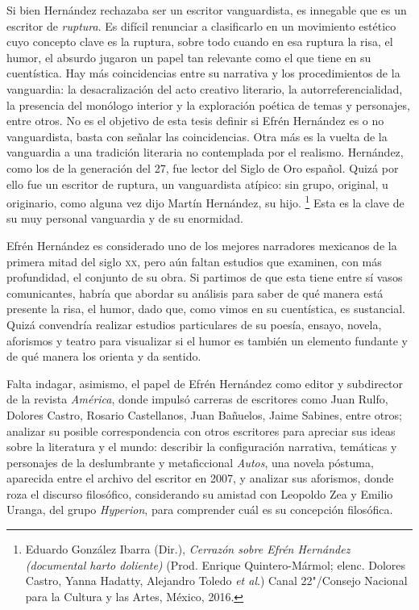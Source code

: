 \documentclass[14pt,twoside,final]{extbook} %
\let\oldfootnote\footnote
\renewcommand\footnote[1]{%
\oldfootnote{\hspace{1mm}#1}}
\begin{document}
Si bien Hernández rechazaba ser un escritor vanguardista, es innegable que es un escritor de \emph{ruptura}. Es difícil renunciar a clasificarlo en un movimiento estético cuyo concepto clave es la ruptura, sobre todo cuando en esa ruptura la risa, el humor, el absurdo jugaron un papel tan relevante como el que tiene en su cuentística. Hay más coincidencias entre su narrativa y los procedimientos de la vanguardia: la desacralización del acto creativo literario, la autorreferencialidad, la presencia del monólogo interior y la exploración poética de temas y personajes, entre otros. No es el objetivo de esta tesis definir si Efrén Hernández es o no vanguardista, basta con señalar las coincidencias. Otra más es la vuelta de la vanguardia a una tradición literaria no contemplada por el realismo. Hernández, como los de la generación del 27, fue lector del Siglo de Oro español. Quizá por ello fue un escritor de ruptura, un vanguardista atípico: sin grupo, original, u originario, como alguna vez dijo Martín Hernández, su hijo.\footnote{Eduardo González Ibarra (Dir.), \emph{Cerrazón sobre Efrén Hernández (documental harto doliente)} (Prod. Enrique Quintero-Mármol; elenc. Dolores Castro, Yanna Hadatty, Alejandro Toledo \emph{et al}.) Canal 22"/Consejo Nacional para la Cultura y las Artes, México, 2016.} Esta es la clave de su muy personal vanguardia y de su enormidad.
\def\dinkus{\bfseries\textasteriskcentered\space\textasteriskcentered\space\textasteriskcentered}
\begin{center}
\dinkus
\end{center}
Efrén Hernández es considerado uno de los mejores narradores mexicanos de la primera mitad del siglo \textsc{xx}, pero aún faltan estudios que examinen, con más profundidad, el conjunto de su obra. Si partimos de que esta tiene entre sí vasos comunicantes, habría que abordar su análisis para saber de qué manera está presente la risa, el humor, dado que, como vimos en su cuentística, es sustancial. Quizá convendría realizar estudios particulares de su poesía, ensayo, novela, aforismos y teatro para visualizar si el humor es también un elemento fundante y de qué manera los orienta y da sentido.

Falta indagar, asimismo, el papel de Efrén Hernández como editor y subdirector de la revista \emph{América}, donde impulsó carreras de escritores como Juan Rulfo, Dolores Castro, Rosario Castellanos, Juan Bañuelos, Jaime Sabines, entre otros; analizar su posible correspondencia con otros escritores para apreciar sus ideas sobre la literatura y el mundo: describir la configuración narrativa, temáticas y personajes de la deslumbrante y metaficcional \emph{Autos}, una novela póstuma, aparecida entre el archivo del escritor en 2007, y analizar sus aforismos, donde roza el discurso filosófico, considerando su amistad con Leopoldo Zea y Emilio Uranga, del grupo \emph{Hyperion}, para comprender cuál es su concepción filosófica.
\end{document}
